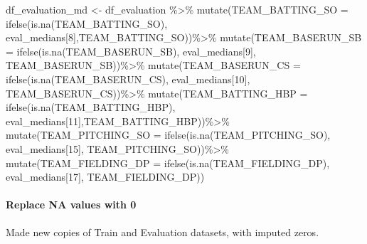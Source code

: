 \documentclass[
]{article}
\newenvironment{Shaded}{\begin{snugshade}}{\end{snugshade}}
\newcommand{\AttributeTok}[1]{\textcolor[rgb]{0.77,0.63,0.00}{#1}}
\newcommand{\DecValTok}[1]{\textcolor[rgb]{0.00,0.00,0.81}{#1}}
\newcommand{\FunctionTok}[1]{\textcolor[rgb]{0.00,0.00,0.00}{#1}}
\newcommand{\NormalTok}[1]{#1}
\newcommand{\OtherTok}[1]{\textcolor[rgb]{0.56,0.35,0.01}{#1}}
\newcommand{\SpecialCharTok}[1]{\textcolor[rgb]{0.00,0.00,0.00}{#1}}
\begin{document}
\begin{Shaded}
\begin{Highlighting}[]
\NormalTok{df\_evaluation\_md }\OtherTok{\textless{}{-}}\NormalTok{ df\_evaluation }\SpecialCharTok{\%\textgreater{}\%}
  \FunctionTok{mutate}\NormalTok{(}\AttributeTok{TEAM\_BATTING\_SO =}
           \FunctionTok{ifelse}\NormalTok{(}\FunctionTok{is.na}\NormalTok{(TEAM\_BATTING\_SO),}
\NormalTok{                  eval\_medians[}\DecValTok{8}\NormalTok{],TEAM\_BATTING\_SO))}\SpecialCharTok{\%\textgreater{}\%} 
  \FunctionTok{mutate}\NormalTok{(}\AttributeTok{TEAM\_BASERUN\_SB =} 
           \FunctionTok{ifelse}\NormalTok{(}\FunctionTok{is.na}\NormalTok{(TEAM\_BASERUN\_SB),}
\NormalTok{                  eval\_medians[}\DecValTok{9}\NormalTok{], TEAM\_BASERUN\_SB))}\SpecialCharTok{\%\textgreater{}\%}
  \FunctionTok{mutate}\NormalTok{(}\AttributeTok{TEAM\_BASERUN\_CS =}
           \FunctionTok{ifelse}\NormalTok{(}\FunctionTok{is.na}\NormalTok{(TEAM\_BASERUN\_CS),}
\NormalTok{                  eval\_medians[}\DecValTok{10}\NormalTok{], TEAM\_BASERUN\_CS))}\SpecialCharTok{\%\textgreater{}\%}
  \FunctionTok{mutate}\NormalTok{(}\AttributeTok{TEAM\_BATTING\_HBP =} 
           \FunctionTok{ifelse}\NormalTok{(}\FunctionTok{is.na}\NormalTok{(TEAM\_BATTING\_HBP),}
\NormalTok{                  eval\_medians[}\DecValTok{11}\NormalTok{],TEAM\_BATTING\_HBP))}\SpecialCharTok{\%\textgreater{}\%}
  \FunctionTok{mutate}\NormalTok{(}\AttributeTok{TEAM\_PITCHING\_SO =}
           \FunctionTok{ifelse}\NormalTok{(}\FunctionTok{is.na}\NormalTok{(TEAM\_PITCHING\_SO),}
\NormalTok{                  eval\_medians[}\DecValTok{15}\NormalTok{], TEAM\_PITCHING\_SO))}\SpecialCharTok{\%\textgreater{}\%}
  \FunctionTok{mutate}\NormalTok{(}\AttributeTok{TEAM\_FIELDING\_DP =}
           \FunctionTok{ifelse}\NormalTok{(}\FunctionTok{is.na}\NormalTok{(TEAM\_FIELDING\_DP),}
\NormalTok{                  eval\_medians[}\DecValTok{17}\NormalTok{], TEAM\_FIELDING\_DP))}
\end{Highlighting}
\end{Shaded}

\hypertarget{replace-na-values-with-0}{%
\paragraph{\texorpdfstring{\textbf{Replace NA values with
0}}{Replace NA values with 0}}\label{replace-na-values-with-0}}

Made new copies of Train and Evaluation datasets, with imputed zeros.
\end{document}

